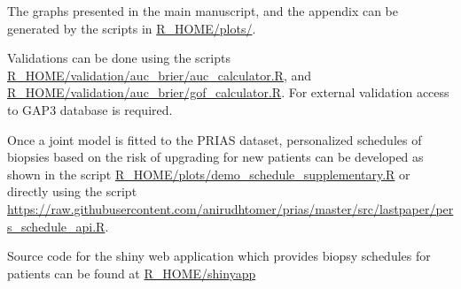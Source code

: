 \begin{subappendices}
The graphs presented in the main manuscript, and the appendix can be generated by the scripts in \url{R_HOME/plots/}.

Validations can be done using the scripts \url{R_HOME/validation/auc_brier/auc_calculator.R}, and \url{R_HOME/validation/auc_brier/gof_calculator.R}. For external validation access to GAP3 database is required.

Once a joint model is fitted to the PRIAS dataset, personalized schedules of biopsies based on the risk of upgrading for new patients can be developed as shown in the script \url{R_HOME/plots/demo_schedule_supplementary.R} or directly using the script \url{https://raw.githubusercontent.com/anirudhtomer/prias/master/src/lastpaper/pers_schedule_api.R}.

Source code for the shiny web application which provides biopsy schedules for patients can be found at \url{R_HOME/shinyapp}
\end{subappendices}